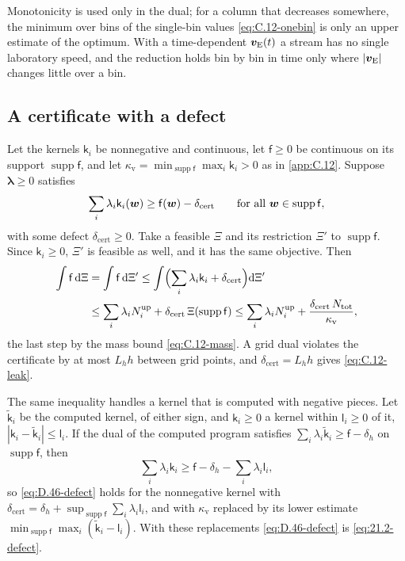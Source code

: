 Monotonicity is used only in the dual; for a column that decreases somewhere, the minimum over bins of the single-bin values \cref{eq:C.12-onebin} is only an upper estimate of the optimum. With a time-dependent $\bm{v}_{\mathrm{E}}(t)$ a stream has no single laboratory speed, and the reduction holds bin by bin in time only where $|\bm{v}_{\mathrm{E}}|$ changes little over a bin.

\subsection{A certificate with a defect}

Let the kernels $\mathsf{k}_i$ be nonnegative and continuous, let $\mathsf{f} \ge 0$ be continuous on its support $\operatorname{supp}\mathsf{f}$, and let $\kappa_{\mathrm{v}} = \min_{\operatorname{supp}\mathsf{f}}\max_i\mathsf{k}_i > 0$ as in \cref{app:C.12}. Suppose $\boldsymbol\lambda \ge 0$ satisfies
\begin{equation*}
  \sum_i\lambda_i\mathsf{k}_i(\bm{w}) \ge \mathsf{f}(\bm{w}) - \delta_{\mathrm{cert}} \qquad \text{for all } \bm{w} \in \operatorname{supp}\mathsf{f} ,
\end{equation*}
with some defect $\delta_{\mathrm{cert}} \ge 0$. Take a feasible $\Xi$ and its restriction $\Xi'$ to $\operatorname{supp}\mathsf{f}$. Since $\mathsf{k}_i \ge 0$, $\Xi'$ is feasible as well, and it has the same objective. Then
\begin{equation}
  \begin{split}
  \int\mathsf{f}\,\mathrm{d}\Xi &= \int\mathsf{f}\,\mathrm{d}\Xi' \le \int\Bigl(\sum_i\lambda_i\mathsf{k}_i + \delta_{\mathrm{cert}}\Bigr)\mathrm{d}\Xi'\\
  &\le \sum_i\lambda_iN_i^{\mathrm{up}} + \delta_{\mathrm{cert}}\,\Xi(\operatorname{supp}\mathsf{f}) \le \sum_i\lambda_iN_i^{\mathrm{up}} + \frac{\delta_{\mathrm{cert}}\,N_{\mathrm{tot}}}{\kappa_{\mathrm{v}}} ,
  \end{split}
  \label{eq:D.46-defect}
\end{equation}
the last step by the mass bound \cref{eq:C.12-mass}. A grid dual violates the certificate by at most $L_hh$ between grid points, and $\delta_{\mathrm{cert}} = L_hh$ gives \cref{eq:C.12-leak}.

The same inequality handles a kernel that is computed with negative pieces. Let $\tilde{\mathsf{k}}_i$ be the computed kernel, of either sign, and $\mathsf{k}_i \ge 0$ a kernel within $\mathsf{l}_i \ge 0$ of it, $|\mathsf{k}_i - \tilde{\mathsf{k}}_i| \le \mathsf{l}_i$. If the dual of the computed program satisfies $\sum_i\lambda_i\tilde{\mathsf{k}}_i \ge \mathsf{f} - \delta_h$ on $\operatorname{supp}\mathsf{f}$, then
\begin{equation*}
  \sum_i\lambda_i\mathsf{k}_i \ge \mathsf{f} - \delta_h - \sum_i\lambda_i\mathsf{l}_i ,
\end{equation*}
so \cref{eq:D.46-defect} holds for the nonnegative kernel with $\delta_{\mathrm{cert}} = \delta_h + \sup_{\operatorname{supp}\mathsf{f}}\sum_i\lambda_i\mathsf{l}_i$, and with $\kappa_{\mathrm{v}}$ replaced by its lower estimate $\min_{\operatorname{supp}\mathsf{f}}\max_i(\tilde{\mathsf{k}}_i - \mathsf{l}_i)$. With these replacements \cref{eq:D.46-defect} is \cref{eq:21.2-defect}.

